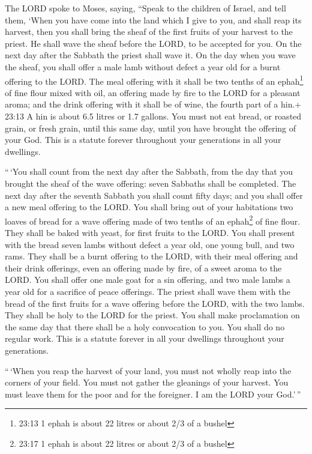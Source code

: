  The LORD spoke to Moses, saying,  ``Speak to
the children of Israel, and tell them, `When you have come into the land
which I give to you, and shall reap its harvest, then you shall bring
the sheaf of the first fruits of your harvest to the priest.
 He shall wave the sheaf before the LORD, to be accepted
for you. On the next day after the Sabbath the priest shall wave it.
 On the day when you wave the sheaf, you shall offer a male
lamb without defect a year old for a burnt offering to the LORD.
 The meal offering with it shall be two tenths of an
ephah\footnote{23:13 1 ephah is about 22 litres or about 2/3 of a bushel}
of fine flour mixed with oil, an offering made by fire to the LORD for a
pleasant aroma; and the drink offering with it shall be of wine, the
fourth part of a hin.+ 23:13 A hin is about 6.5 litres or 1.7 gallons.
 You must not eat bread, or roasted grain, or fresh grain,
until this same day, until you have brought the offering of your God.
This is a statute forever throughout your generations in all your
dwellings.

 ``\,`You shall count from the next day after the Sabbath,
from the day that you brought the sheaf of the wave offering: seven
Sabbaths shall be completed.  The next day after the
seventh Sabbath you shall count fifty days; and you shall offer a new
meal offering to the LORD.  You shall bring out of your
habitations two loaves of bread for a wave offering made of two tenths
of an ephah\footnote{23:17 1 ephah is about 22 litres or about 2/3 of a
  bushel} of fine flour. They shall be baked with yeast, for first
fruits to the LORD.  You shall present with the bread seven
lambs without defect a year old, one young bull, and two rams. They
shall be a burnt offering to the LORD, with their meal offering and
their drink offerings, even an offering made by fire, of a sweet aroma
to the LORD.  You shall offer one male goat for a sin
offering, and two male lambs a year old for a sacrifice of peace
offerings.  The priest shall wave them with the bread of
the first fruits for a wave offering before the LORD, with the two
lambs. They shall be holy to the LORD for the priest.  You
shall make proclamation on the same day that there shall be a holy
convocation to you. You shall do no regular work. This is a statute
forever in all your dwellings throughout your generations.

 ``\,`When you reap the harvest of your land, you must not
wholly reap into the corners of your field. You must not gather the
gleanings of your harvest. You must leave them for the poor and for the
foreigner. I am the LORD your God.'\,''

